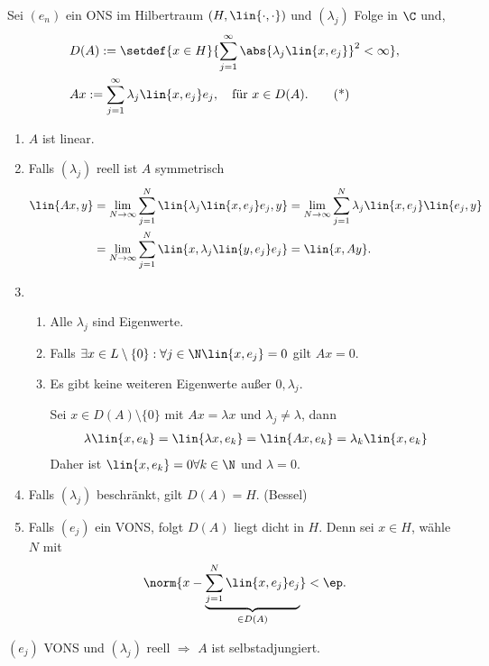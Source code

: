 \begin{bsp}
\label{bsp:1.16}
Sei $(e_n)$ ein ONS im Hilbertraum $(H,\lin{\cdot,\cdot})$ und $(\lambda_j)$
Folge in $\C$ und,
\begin{align*}
&D(A) := \setdef{x\in H}{\sum\limits_{j=1}^\infty \abs{\lambda_j \lin{x,e_j}}^2
< \infty},\\
&Ax := \sum\limits_{j=1}^\infty \lambda_j \lin{x,e_j}e_j,\quad \text{für } x\in
D(A).\tag{*}
\end{align*}
\begin{enumerate}[label=\arabic{*}.)]
  \item $A$ ist linear.
  \item Falls $(\lambda_j)$ reell ist $A$ symmetrisch
\begin{align*}
\lin{Ax,y} &= \lim\limits_{N\to\infty} \sum\limits_{j=1}^N
\lin{\lambda_j\lin{x,e_j}e_j,y} = \lim\limits_{N\to\infty} \sum\limits_{j=1}^N
\lambda_j\lin{x,e_j}\lin{e_j,y}\\
 &= \lim\limits_{N\to\infty} \sum\limits_{j=1}^N \lin{x,\lambda_j
 \lin{y,e_j}e_j}= \lin{x,Ay}.
\end{align*}
\item
\begin{enumerate}[label=(\roman{*})]
\item Alle $\lambda_j$ sind Eigenwerte.
\item Falls $\exists x\in L\setminus\{0\} : \forall j\in\N \lin{x,e_j} = 0$
gilt $Ax = 0$.
\item Es gibt keine weiteren Eigenwerte außer $0,\lambda_j$.

Sei $x\in D(A)\setminus\{0\}$ mit $Ax = \lambda x$ und $\lambda_j \neq\lambda$,
dann
\begin{align*}
\lambda\lin{x,e_k}  = \lin{\lambda x,e_k} = \lin{Ax,e_k} = \lambda_k
\lin{x,e_k}
\end{align*}
Daher ist $\lin{x,e_k} = 0\forall k\in\N$ und $\lambda = 0$.
\end{enumerate}
\item Falls $(\lambda_j)$ beschränkt, gilt $D(A) = H$. (Bessel)
\item Falls $(e_j)$ ein VONS, folgt $D(A)$ liegt dicht in $H$. Denn sei $x\in
H$, wähle $N$ mit
\begin{align*}
\norm{x-\underbrace{\sum\limits_{j=1}^N \lin{x,e_j}e_j}_{\in D(A)}} < \ep.
\end{align*}
\end{enumerate}
\begin{bemn}[Ausblick.]
$(e_j)$ VONS und $(\lambda_j)$ reell $\Rightarrow $ $A$ ist
selbstadjungiert.\bsphere
\end{bemn}
\end{bsp}

